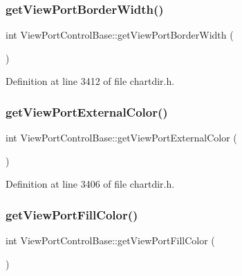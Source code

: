\subsubsection{\texorpdfstring{get\+View\+Port\+Border\+Width()}{getViewPortBorderWidth()}}
{\footnotesize\ttfamily int View\+Port\+Control\+Base\+::get\+View\+Port\+Border\+Width (\begin{DoxyParamCaption}{ }\end{DoxyParamCaption})\hspace{0.3cm}{\ttfamily [inline]}}



Definition at line 3412 of file chartdir.\+h.

\mbox{\label{class_view_port_control_base_ac55d048e9b344c04338db5ba2e4e6527}} 
\subsubsection{\texorpdfstring{get\+View\+Port\+External\+Color()}{getViewPortExternalColor()}}
{\footnotesize\ttfamily int View\+Port\+Control\+Base\+::get\+View\+Port\+External\+Color (\begin{DoxyParamCaption}{ }\end{DoxyParamCaption})\hspace{0.3cm}{\ttfamily [inline]}}



Definition at line 3406 of file chartdir.\+h.

\mbox{\label{class_view_port_control_base_af024de68b7ea4106c825e5da80588b27}} 
\subsubsection{\texorpdfstring{get\+View\+Port\+Fill\+Color()}{getViewPortFillColor()}}
{\footnotesize\ttfamily int View\+Port\+Control\+Base\+::get\+View\+Port\+Fill\+Color (\begin{DoxyParamCaption}{ }\end{DoxyParamCaption})\hspace{0.3cm}{\ttfamily [inline]}}



